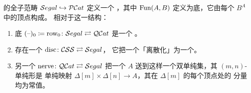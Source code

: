 \begin{proposition}\label{prop:segal-cosmos}
\trSegalCategories{}的全子范畴 $\mathcal{S}egal\hookrightarrow\mathcal{P}\mathcal{C}at$ 定义一个%
\trCartesianClosed{}\trInfinityCosmos，其中\trFunctorSpace{} $\operatorname{Fun}(A,B)$
定义为底\trQuasiCategory，它由每个\trInternalHom{} $B^{A}$ 中的顶点构成。
相对于这一\trInfinityCosmos{}结构：
\begin{enumerate}[label=(\roman*)]
\item 底\trQuasiCategory{}\trFunctor{} $(\text{--})_{0}\coloneqq\mathrm{row}_{0}\colon\mathcal{S}egal\rightleftarrows\mathcal{Q}\mathcal{C}at$ 是一个%
  \trCosmologicalBiequivalence。
\item 存在一个\trCosmologicalBiequivalence{} $\mathrm{disc}\colon\mathcal{C}\mathcal{S}\mathcal{S}\rightleftarrows\mathcal{S}egal$，
  它把一个\trCompleteSegalSpaces{}「离散化」为一个\trSegalCategories。
\item 另一个\trCosmologicalBiequivalence{} $\mathrm{nerve}\colon\mathcal{Q}\mathcal{C}at\rightleftarrows\mathcal{S}egal$
  把一个\trQuasiCategory{} $A$ 送到这样一个双单纯集，其 $(m,n)$-单纯形是
  单纯映射 $\Delta[m]\times\Delta[n]\to A$，其在 $\Delta[m]$ 的每个顶点处的
  分量均为常值。
\end{enumerate}
\end{proposition}
